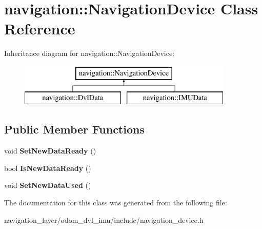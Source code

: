 \hypertarget{classnavigation_1_1NavigationDevice}{}\section{navigation\+:\+:Navigation\+Device Class Reference}
\label{classnavigation_1_1NavigationDevice}
Inheritance diagram for navigation\+:\+:Navigation\+Device\+:\begin{figure}[H]
\begin{center}
\leavevmode
\includegraphics[height=2.000000cm]{classnavigation_1_1NavigationDevice}
\end{center}
\end{figure}
\subsection*{Public Member Functions}
\begin{DoxyCompactItemize}
\item 
\mbox{\label{classnavigation_1_1NavigationDevice_ac4e032654f33b2a5dd3abd6294a0feb6}} 
void {\bfseries Set\+New\+Data\+Ready} ()
\item 
\mbox{\label{classnavigation_1_1NavigationDevice_a346b6be48e11c521c1f4b939ea86164b}} 
bool {\bfseries Is\+New\+Data\+Ready} ()
\item 
\mbox{\label{classnavigation_1_1NavigationDevice_a8893fb5dce4975a994929fdb612acb7b}} 
void {\bfseries Set\+New\+Data\+Used} ()
\end{DoxyCompactItemize}


The documentation for this class was generated from the following file\+:\begin{DoxyCompactItemize}
\item 
navigation\+\_\+layer/odom\+\_\+dvl\+\_\+imu/include/navigation\+\_\+device.\+h\end{DoxyCompactItemize}
